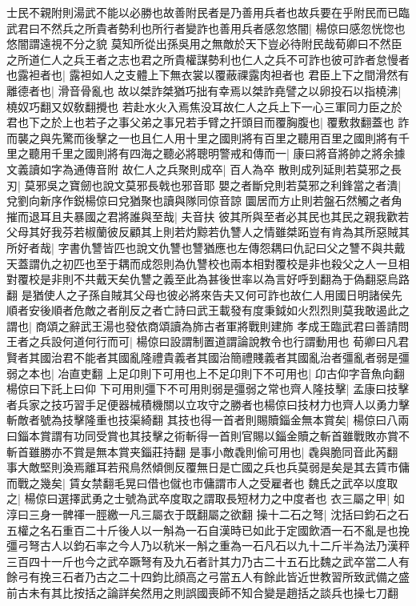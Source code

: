 士民不親附則湯武不能以必勝也故善附民者是乃善用兵者也故兵要在乎附民而已臨武君曰不然兵之所貴者勢利也所行者變詐也善用兵者感忽悠闇|{
	楊倞曰感忽恍惚也悠闇謂遠視不分之貌}
莫知所從出孫吳用之無敵於天下豈必待附民哉荀卿曰不然臣之所道仁人之兵王者之志也君之所貴權謀勢利也仁人之兵不可詐也彼可詐者怠慢者也露袒者也|{
	露袒如人之支體上下無衣裳以覆蔽祼露肉袒者也}
君臣上下之間滑然有離德者也|{
	滑音骨亂也}
故以桀詐桀猶巧拙有幸焉以桀詐堯譬之以卵投石以指橈沸|{
	橈奴巧翻又奴敎翻攪也}
若赴水火入焉焦没耳故仁人之兵上下一心三軍同力臣之於君也下之於上也若子之事父弟之事兄若手臂之扞頭目而覆胸腹也|{
	覆敷救翻蓋也}
詐而襲之與先驚而後擊之一也且仁人用十里之國則將有百里之聽用百里之國則將有千里之聽用千里之國則將有四海之聽必將聰明警戒和傳而一|{
	康曰將音將帥之將余據文義讀如字為通傳音附}
故仁人之兵聚則成卒|{
	百人為卒}
散則成列延則若莫邪之長刃|{
	莫邪吳之寶劒也說文莫邪長戟也邪音耶}
嬰之者斷兌則若莫邪之利鋒當之者潰|{
	兌劉向新序作鋭楊倞曰兌猶聚也讀與隊同倞音諒}
圜居而方止則若盤石然觸之者角摧而退耳且夫暴國之君將誰與至哉|{
	夫音扶}
彼其所與至者必其民也其民之親我歡若父母其好我芬若椒蘭彼反顧其上則若灼黥若仇讐人之情雖桀跖豈有肯為其所惡賊其所好者哉|{
	字書仇讐皆匹也說文仇讐也讐猶應也左傳怨耦曰仇記曰父之讐不與共戴天蓋謂仇之初匹也至于耦而成怨則為仇讐校也兩本相對覆校是非也殺父之人一旦相對覆校是非則不共戴天矣仇讐之義至此為甚後世率以為言好呼到翻為于偽翻惡烏路翻}
是猶使人之子孫自賊其父母也彼必將來告夫又何可詐也故仁人用國日明諸侯先順者安後順者危敵之者削反之者亡詩曰武王載發有度秉鉞如火烈烈則莫我敢遏此之謂也|{
	商頌之辭武王湯也發依商頌讀為斾古者軍將戰則建斾}
孝成王臨武君曰善請問王者之兵設何道何行而可|{
	楊倞曰設謂制置道謂論說教令也行謂動用也}
荀卿曰凡君賢者其國治君不能者其國亂隆禮貴義者其國治簡禮賤義者其國亂治者彊亂者弱是彊弱之本也|{
	冶直吏翻}
上足卬則下可用也上不足卬則下不可用也|{
	卬古仰字音魚向翻楊倞曰下託上曰仰}
下可用則彊下不可用則弱是彊弱之常也齊人隆技擊|{
	孟康曰技擊者兵家之技巧習手足便器械積機關以立攻守之勝者也楊倞曰技材力也齊人以勇力擊斬敵者號為技擊隆重也技渠綺翻}
其技也得一首者則賜贖錙金無本賞矣|{
	楊倞曰八兩曰錙本賞謂有功同受賞也其技擊之術斬得一首則官賜以錙金贖之斬首雖戰敗亦賞不斬首雖勝亦不賞是無本賞夹錙莊持翻}
是事小敵毳則偷可用也|{
	毳與脆同音此芮翻}
事大敵堅則渙焉離耳若飛鳥然傾側反覆無日是亡國之兵也兵莫弱是矣是其去賃市傭而戰之幾矣|{
	賃女禁翻毛晃曰借也僦也市傭謂市人之受雇者也}
魏氏之武卒以度取之|{
	楊倞曰選擇武勇之士號為武卒度取之謂取長短材力之中度者也}
衣三屬之甲|{
	如淳曰三身一髀禈一脛繳一凡三屬衣于既翻屬之欲翻}
操十二石之弩|{
	沈括曰鈞石之石五權之名石重百二十斤後人以一斛為一石自漢時已如此于定國飲酒一石不亂是也挽彊弓弩古人以鈞石率之今人乃以秔米一斛之重為一石凡石以九十二斤半為法乃漢秤三百四十一斤也今之武卒蹶弩有及九石者計其力乃古二十五石比魏之武卒當二人有餘弓有挽三石者乃古之二十四鈞比顔高之弓當五人有餘此皆近世教習所致武備之盛前古未有其比按括之論詳矣然用之則誤國喪師不知合變是趙括之談兵也操七刀翻}
